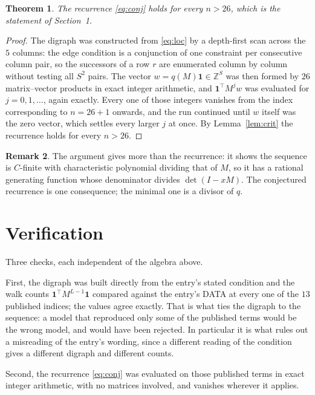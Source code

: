\documentclass[11pt,a4paper]{article}
\theoremstyle{plain}
\newtheorem{theorem}{Theorem}
\theoremstyle{definition}
\newtheorem{remark}[theorem]{Remark}
\begin{document}
\begin{theorem}
The recurrence \eqref{eq:conj} holds for every $n>26$, which is the statement of
Section~1.
\end{theorem}

\begin{proof}
The digraph was constructed from \eqref{eq:loc} by a depth-first scan across the $5$
columns: the edge condition is a conjunction of one constraint per consecutive column
pair, so the successors of a row $r$ are enumerated column by column without testing all
$S^2$ pairs. The vector $w=q(M)\mathbf{1}\in\mathbb{Z}^{S}$ was then formed by $26$
matrix--vector products in exact integer arithmetic, and $\mathbf{1}^{\!\top}M^{j}w$ was
evaluated for $j=0,1,\dots$, again exactly. Every one of those integers vanishes from the
index corresponding to $n=26+1$ onwards, and the run continued until $w$ itself was the
zero vector, which settles every larger $j$ at once. By Lemma~\ref{lem:crit} the recurrence
holds for every $n>26$.
\end{proof}

\begin{remark}
The argument gives more than the recurrence: it shows the sequence is $C$-finite with
characteristic polynomial dividing that of $M$, so it has a rational generating function
whose denominator divides $\det(I-xM)$. The conjectured recurrence is one consequence; the
minimal one is a divisor of $q$.
\end{remark}

\section{Verification}

Three checks, each independent of the algebra above.

First, the digraph was built directly from the entry's stated condition and the walk counts
$\mathbf{1}^{\!\top}M^{L-1}\mathbf{1}$ compared against the entry's DATA at
every one of the $13$ published indices; the values agree exactly. That is what ties
the digraph to the sequence: a model that reproduced only some of the published terms would
be the wrong model, and would have been rejected. In particular it is what rules out a
misreading of the entry's wording, since a different reading of the condition gives a
different digraph and different counts.

Second, the recurrence \eqref{eq:conj} was evaluated on those published terms in exact
integer arithmetic, with no matrices involved, and vanishes wherever it applies.
\end{document}
